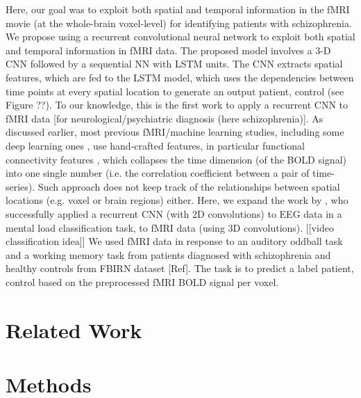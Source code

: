 \documentclass{article} %
\begin{document}
Here, our goal was to exploit both spatial and temporal information in the fMRI movie (at the whole-brain voxel-level) for identifying patients with schizophrenia. We propose using a recurrent convolutional neural network to exploit both spatial and temporal information in fMRI data. The proposed model involves a 3-D CNN followed by a sequential NN with LSTM units. The CNN extracts spatial features, which are fed to the LSTM model, which uses the dependencies between time points at every spatial location to generate an output {patient, control} (see Figure ??). To our knowledge, this is the first work to apply a recurrent CNN to fMRI data [for neurological/psychiatric diagnosis (here schizophrenia)]. As discussed earlier, most previous fMRI/machine learning studies, including some deep learning ones \citep{Kim2016}, use hand-crafted features, in particular functional connectivity features \citep{Gheiratmand2017}, which collapses the time dimension (of the BOLD signal) into one single number (i.e. the correlation coefficient between a pair of time-series). Such approach does not keep track of the relationships between spatial locations (e.g. voxel or brain regions) either. Here, we expand the work by \citet{Bashivan2016}, who successfully applied a recurrent CNN (with 2D convolutions) to EEG data in a mental load classification task, to fMRI data (using 3D convolutions). [[video classification idea]] We used fMRI data in response to an auditory oddball task and a working memory task from patients diagnosed with schizophrenia and healthy controls from FBIRN dataset [Ref]. The task is to predict a label {patient, control} based on the preprocessed fMRI BOLD signal per voxel.




\section{Related Work}


\section{Methods}
\end{document}
